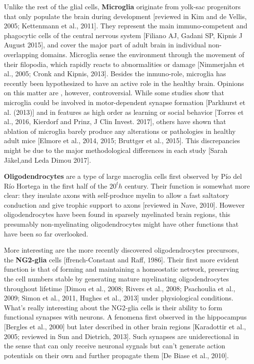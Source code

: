 Unlike the rest of the glial cells, \textbf{Microglia} originate from yolk-sac progenitors that only populate the brain during development [reviewed in Kim and de Vellis, 2005; Kettenmann et al., 2011].
They represent the main immuno-competent and phagocytic cells of the central nervous system [Filiano AJ, Gadani SP, Kipnis J August 2015], and cover the major part of adult brain in individual non-overlapping domains.
Microglia sense the environment through the movement of their filopodia, which rapidly reacts to abnormalities or damage [Nimmerjahn et al., 2005; Cronk and Kipnis, 2013].
Besides the inmuno-role, microglia has recently been hypothesized to have an active role in the healthy brain. 
Opinions on this matter are , however, controversial. 
While some studies show that microglia could be involved in motor-dependent synapse formation [Parkhurst et al. (2013)] and in features as high order as learning or social behavior [Torres et al., 2016, Kierdorf and Prinz, J Clin Invest. 2017], others have shown that ablation of microglia barely produce any alterations or pathologies in healthy adult mice [Elmore et al., 2014, 2015; Bruttger et al., 2015].
This discrepancies might be due to the major methodological differences in each study [Sarah Jäkel,and Leda Dimou 2017].

\textbf{Oligodendrocytes} are a type of large macroglia cells first observed by Pío del Río Hortega in the first half of the $20^th$ century.  
Their function is somewhat more clear: they insulate axons with self-produce myelin to allow a fast saltatory conduction and give trophic support to axons [reviewed in Nave, 2010].
However oligodendrocytes have been found in sparsely myelinated brain regions, this presumably non-myelinating oligodendrocytes might have other functions that have been so far overlooked.

More interesting are the more recently discovered oligodendrocytes precursors, the \textbf{NG2-glia} cells [ffrench-Constant and Raff, 1986].
Their first more evident function is that of forming and maintaining a homeostatic network, preserving the cell numbers stable by generating mature myelinating oligodendrocytes throughout lifetime [Dimou et al., 2008; Rivers et al., 2008; Psachoulia et al., 2009; Simon et al., 2011, Hughes et al., 2013] under physiological conditions.
What's really interesting about the NG2-glia cells is their ability to form functional synapses with neurons.
A fenomena first observed in the hippocampus [Bergles et al., 2000] but later described in other brain regions [Karadottir et al., 2005; reviewed in Sun and Dietrich, 2013].
Such synapses are uniderectional in the sense that can only receive neuronal sygnals but can't generate action potentials on their own and further propagate them [De Biase et al., 2010].

